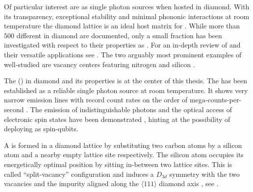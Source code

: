   Of particular interest are \ccs as single photon sources when hosted in diamond. With its transparency, exceptional stability and minimal phononic interactions at room temperature the diamond lattice is an ideal host matrix for \ccs \cite{Kennedy2003,Greentree2008}. While more than $500$ different \ccs in diamond are documented, only a small fraction has been investigated with respect to their properties as \spss \cite{Zaitsev2001}. For an in-depth review of \ccs and their versatile applications see \cite{Aharonovich2014, Prawer2014}. The two arguably most prominent examples of well-studied \ccs are vacancy centers featuring nitrogen and silicon \cite{Manson2006, Jelezko2002, Santori2006}.

  The \sivc (\siv) in diamond and its properties is at the center of this thesis. The \siv has been established as a reliable single photon source at room temperature. It shows very narrow emission lines with record count rates on the order of mega-counts-per-second \cite{Neu2012a}. The emission of indistinguishable photons and the optical access of electronic spin states have been demonstrated \cite{Sipahigil2014, Mueller2014, Pingault2014, Rogers2014a}, hinting at the possibility of deploying \sivs as spin-qubits.

  A \sivc is formed in a diamond lattice by substituting two carbon atoms by a silicon atom and a nearby empty lattice site respectively. The silicon atom occupies its energetically optimal position by sitting in-between two lattice sites. This is called ``split-vacancy'' configuration and induces a $D_{3d}$ symmetry with the two vacancies and the impurity aligned along the $\langle 111 \rangle$ diamond axis \cite{Goss2007}, see .


